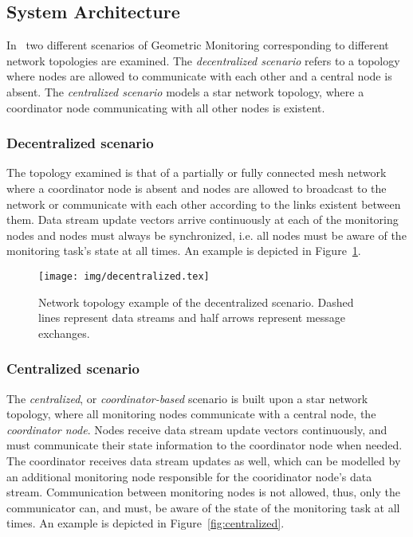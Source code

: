 \subsection{System Architecture} \label{subsec:theorBack-GM-sysArch}

In~\cite{Sharfman2006GM} two different scenarios of Geometric Monitoring corresponding to different network topologies are examined. The \emph{decentralized scenario} refers to a topology where nodes are allowed to communicate with each other and a central node is absent. The \emph{centralized scenario} models a star network topology, where a coordinator node communicating with all other nodes is existent.

\subsubsection{Decentralized scenario} \label{subsubsec:theorBack-GM-decentralized}

The topology examined is that of a partially or fully connected mesh network where a coordinator node is absent and nodes are allowed to broadcast to the network or communicate with each other according to the links existent between them. Data stream update vectors arrive continuously at each of the monitoring nodes and nodes must always be synchronized, i.e. all nodes must be aware of the monitoring task's state at all times. An example is depicted in Figure~\ref{fig:decentralized}.

\begin{figure}[H]
\centering
\texttt{[image: img/decentralized.tex]}
\caption{Network topology example of the decentralized scenario. Dashed lines represent data streams and half arrows represent message exchanges.} 
\label{fig:decentralized}
\end{figure}

\subsubsection{Centralized scenario}

The \emph{centralized}, or \emph{coordinator-based} scenario is built upon a star network topology, where all monitoring nodes communicate with a central node, the \emph{coordinator node}. Nodes receive data stream update vectors continuously, and must communicate their state information to the coordinator node when needed. The coordinator receives data stream updates as well, which can be modelled by an additional monitoring node responsible for the cooridinator node's data stream. Communication between monitoring nodes is not allowed, thus, only the communicator can, and must, be aware of the state of the monitoring task at all times. An example is depicted in Figure~\ref{fig:centralized}.

